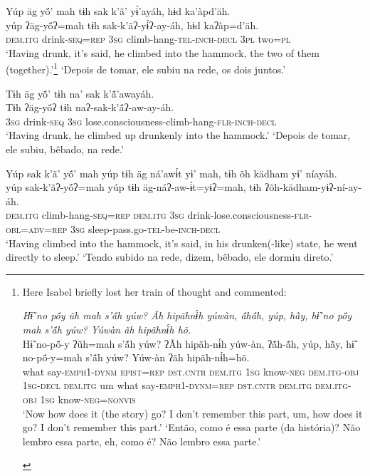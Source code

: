 \documentclass[output=paper,
modfonts,nonflat
]{langsci/langscibook}
\begin{document}
\ea  Yúp äg yö́’ mah tɨh sak k’ã’ yɨ́’ayáh, hɨd ka’àpd’äh.\\ 
\gll yúp ʔäg-yö́ʔ=mah tɨh sak-k’ãʔ-yɨ́ʔ-ay-áh, hɨd kaʔàp=d’äh.\\
     \textsc{dem.itg} drink\textsc{-seq=rep} \textsc{3sg} climb-hang\textsc{-tel-inch-decl} \textsc{3pl} two\textsc{=pl}\\
\glt ‘Having drunk, it’s said, he climbed into the hammock, the two of them (together).'\footnote{Here Isabel briefly lost her train of thought and commented:\\
\begin{exe}
\ex \textit{Hɨ̃ no pö́y ũh mah s’ã́h yúw? Ãh hipãhnɨ́h yúwàn, ã́hã́h, yúp, hã̀y, hɨ̃ no pö́y mah s’ã́h yúw? Yúwàn ãh hipãhnɨ́h hõ.}\\
\gll Hɨ̃ no-pö́-y ʔũh=mah s’ã́h yúw? ʔÃh hipãh-nɨ́h yúw-àn, ʔã́h-ã́h, yúp, hã̀y, hɨ̃ no-pö́-y=mah s’ã́h yúw? Yúw-àn ʔãh hipãh-nɨ́h=hõ.\\
	what say-\textsc{emph1-dynm} \textsc{epist=rep} \textsc{dst.cntr} \textsc{dem.itg} \textsc{1sg} know\textsc{-neg} \textsc{dem.itg-obj} \textsc{1sg-decl} \textsc{dem.itg} um what say\textsc{-emph1-dynm=rep} \textsc{dst.cntr} \textsc{dem.itg} \textsc{dem.itg-obj} \textsc{1sg} know\textsc{-neg=nonvis}\\
\glt ‘Now how does it (the story) go? I don’t remember this part, um, how does it go? I don’t remember this part.’
\glt ‘Então, como é essa parte (da história)? Não lembro essa parte, eh, como é? Não lembro essa parte.'
\end{exe}}
\glt ‘Depois de tomar, ele subiu na rede, os dois juntos.'
\z  

\newpage
\ea  Tɨh äg yö́’ tɨh na’ sak k’ã́’awayáh.\\
\gll Tɨh ʔäg-yö́ʔ tɨh naʔ-sak-k’ã́ʔ-aw-ay-áh.\\
	\textsc{3sg} drink\textsc{-seq} \textsc{3sg} lose.consciousness-climb-hang\textsc{-flr-inch-decl}\\
\glt ‘Having drunk, he climbed up drunkenly into the hammock.’
\glt ‘Depois de tomar, ele subiu, bêbado, na rede.'
\z

\ea  Yúp sak k’ã’ yö́’ mah yúp tɨh äg ná’awɨ́t yɨ’ mah, tɨh õh kädham yɨ’ níayáh.\\ 
\gll yúp sak-k’ãʔ-yö́ʔ=mah yúp tɨh äg-náʔ-aw-ɨ́t=yɨʔ=mah, tɨh ʔõh-kädham-yɨʔ-ní-ay-áh.\\
     \textsc{dem.itg} climb-hang\textsc{-seq=rep} \textsc{dem.itg} \textsc{3sg} drink-lose.consciousness\textsc{-flr-obl=adv=rep} \textsc{3sg} sleep-pass.go\textsc{-tel-}be\textsc{-inch-decl}\\
\glt ‘Having climbed into the hammock, it’s said, in his drunken(-like) state, he went directly to sleep.'
\glt ‘Tendo subido na rede, dizem, bêbado, ele dormiu direto.'
\z 
\end{document}

